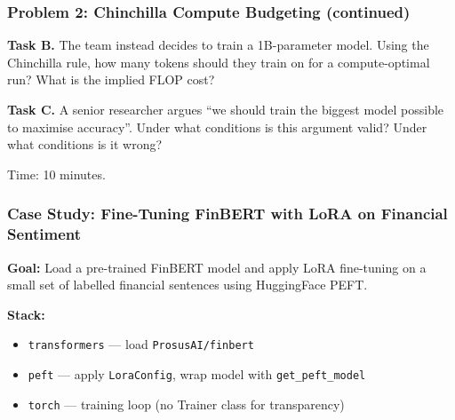 \documentclass[9pt,t]{beamer}
\begin{document}
\begin{frame}
\frametitle{Problem 2: Chinchilla Compute Budgeting (continued)}

\textbf{Task B.} The team instead decides to train a 1B-parameter model.
Using the Chinchilla rule, how many tokens should they train on for a compute-optimal run?
What is the implied FLOP cost?

\medskip
\textbf{Task C.} A senior researcher argues ``we should train the biggest model
possible to maximise accuracy''. Under what conditions is this argument valid?
Under what conditions is it wrong?

\medskip
\begin{block}{Time: 10 minutes.}
\end{block}
\end{frame}

\begin{frame}
\frametitle{Case Study: Fine-Tuning FinBERT with LoRA on Financial Sentiment}

\textbf{Goal:} Load a pre-trained FinBERT model and apply LoRA fine-tuning
on a small set of labelled financial sentences using HuggingFace PEFT.

\medskip
\textbf{Stack:}
\begin{itemize}
  \item \texttt{transformers} --- load \texttt{ProsusAI/finbert}
  \item \texttt{peft} --- apply \texttt{LoraConfig}, wrap model with \texttt{get\_peft\_model}
  \item \texttt{torch} --- training loop (no Trainer class for transparency)
\end{itemize}
\end{frame}
\end{document}
